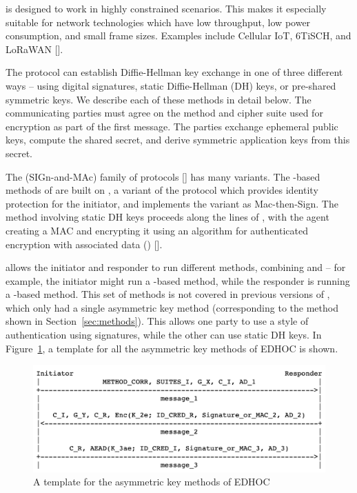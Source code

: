 \mEdhoc is designed to work in highly constrained scenarios. This makes it especially suitable for network technologies which have low throughput, low power consumption, and small frame sizes. Examples include Cellular IoT, 6TiSCH, and LoRaWAN [\mcneed].

The \mEdhoc protocol can establish Diffie-Hellman key exchange in one of three different ways -- using digital signatures, static Diffie-Hellman (DH) keys, or pre-shared symmetric keys. We describe each of these methods in detail below. The communicating parties must agree on the method and cipher suite used for encryption as part of the first message. The parties exchange ephemeral public keys, compute the shared secret, and derive symmetric application keys from this secret.

The \mSigma (SIGn-and-MAc) family of protocols [\mcneed] has many variants. The \mSig-based methods of \mEdhoc are built on \mSigmaI, a variant of the \mSigma protocol which provides identity protection for the initiator, and  implements the \mSigmaI variant as Mac-then-Sign. The method involving static DH keys proceeds along the lines of \mOptls, with the agent creating a MAC and encrypting it using an algorithm for authenticated encryption with associated data (\mAead) [\mcneed]. 

\mEdhoc allows the initiator and responder to run different methods, combining \mSig and \mStat -- for example, the initiator might run a \mSig-based method, while the responder is running a \mStat-based method. This set of methods is not covered in previous versions of \mEdhoc, which only had a single \mSigma asymmetric key method (corresponding to the \mSigSig method shown in Section~\ref{sec:methods}). This allows one party to use a \mSigma style of authentication using signatures, while the other can use static DH keys. In Figure~\ref{fig:edhocasym}, a template for all the asymmetric key methods of EDHOC is shown. 

\begin{figure}[!h]\label{fig:edhocasym}
\centering
\includegraphics[scale=0.3]{Images/asym.png}
\caption{A template for the asymmetric key methods of EDHOC}
\end{figure}

